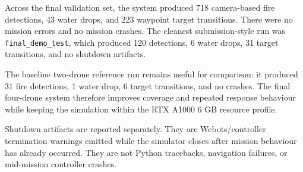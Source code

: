 \documentclass[10pt,a4paper]{article}
\begin{document}
\begin{table}[H]
\centering
\caption{Mission performance across final four-drone validation runs.}
\small
{}
\end{table}

Across the final validation set, the system produced 718 camera-based fire detections, 43 water drops, and 223 waypoint target transitions. There were no mission errors and no mission crashes. The cleanest submission-style run was \texttt{final\_demo\_test}, which produced 120 detections, 6 water drops, 31 target transitions, and no shutdown artifacts.

The baseline two-drone reference run remains useful for comparison: it produced 31 fire detections, 1 water drop, 6 target transitions, and no crashes. The final four-drone system therefore improves coverage and repeated response behaviour while keeping the simulation within the RTX A1000 6 GB resource profile.

Shutdown artifacts are reported separately. They are Webots/controller termination warnings emitted while the simulator closes after mission behaviour has already occurred. They are not Python tracebacks, navigation failures, or mid-mission controller crashes.
\end{document}
